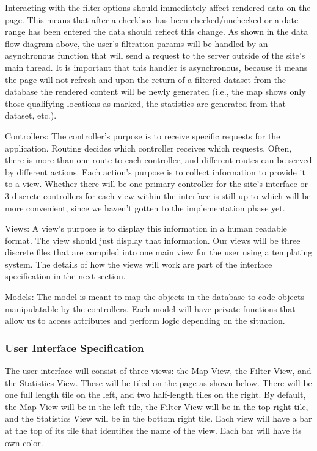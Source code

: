 Interacting with the filter options should immediately affect rendered data on the page. This means that after a checkbox has been checked/unchecked or a date range has been entered the data should reflect this change. As shown in the data flow diagram above, the user’s filtration params will be handled by an asynchronous function that will send a request to the server outside of the site’s main thread. It is important that this handler is asynchronous, because it means the page will not refresh and upon the return of a filtered dataset from the database the rendered content will be newly generated (i.e., the map shows only those qualifying locations as marked, the statistics are generated from that dataset, etc.).

Controllers:
The controller's purpose is to receive specific requests for the application. Routing decides which controller receives which requests. Often, there is more than one route to each controller, and different routes can be served by different actions. Each action's purpose is to collect information to provide it to a view. Whether there will be one primary controller for the site’s interface or 3 discrete controllers for each view within the interface is still up to which will be more convenient, since we haven’t gotten to the implementation phase yet. 

Views:
A view's purpose is to display this information in a human readable format. The view should just display that information. Our views will be three discrete files that are compiled into one main view for the user using a templating system. The details of how the views will work are part of the interface specification in the next section. 

Models:
The model is meant to map the objects in the database to code objects manipulatable by 
the controllers. Each model will have private functions that allow us to access attributes and perform logic depending on the situation. 

\subsubsection{User Interface Specification}

The user interface will consist of three views: the Map View, the Filter View, and the Statistics View. These will be tiled on the page as shown below. There will be one full length tile on the left, and two half-length tiles on the right. By default, the Map View will be in the left tile, the Filter View will be in the top right tile, and the Statistics View will be in the bottom right tile. Each view will have a bar at the top of its tile that identifies the name of the view. Each bar will have its own color.


